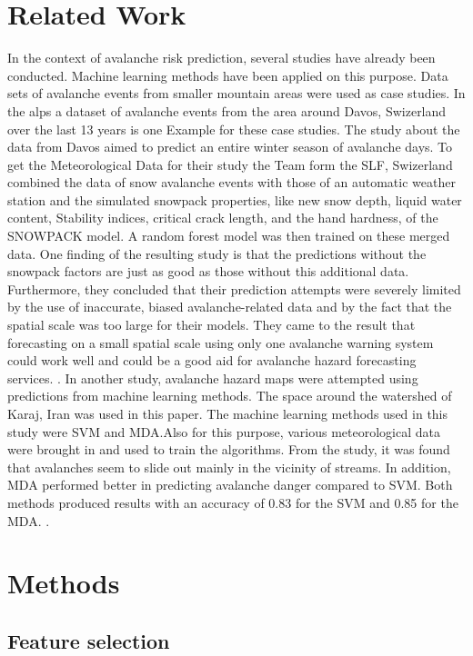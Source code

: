 \documentclass[12pt,a4paper]{article}
\begin{document}
\section{Related Work}
In the context of avalanche risk prediction, several studies have already been conducted. Machine learning methods have been applied on this purpose. Data sets of avalanche events from smaller mountain areas were used as case studies. In the alps a dataset of avalanche events from the area around Davos, Swizerland over the last 13 years is one Example for these case studies. The study about the data from Davos aimed to predict an entire winter season of avalanche days.
To get the Meteorological Data for their study the Team form the SLF, Swizerland combined the data of snow avalanche events with those of an automatic weather station and the simulated snowpack properties, like new snow depth, liquid water content, Stability indices, critical crack length,  and the hand hardness,  of the SNOWPACK model. A random forest model was then trained on these merged data. One finding of the resulting study is that the predictions without the snowpack factors are just as good as those without this additional data. Furthermore, they concluded that their prediction attempts were severely limited by the use of inaccurate, biased avalanche-related data and by the fact that the spatial scale was too large for their models. They came to the result that forecasting on a small spatial scale using only one avalanche warning system could work well and could be a good aid for avalanche hazard forecasting services. \autocite{Harvey:2016}.
In another study, avalanche hazard maps were attempted using predictions from machine learning methods.  The space around the watershed of Karaj, Iran was used in this paper. The machine learning methods used in this study were SVM and MDA.Also for this purpose, various meteorological data were brought in and used to train the algorithms. From the study, it was found that avalanches seem to slide out mainly in the vicinity of streams. In addition, MDA performed better in predicting avalanche danger compared to SVM. Both methods produced results with an accuracy of 0.83 for the SVM and 0.85 for the MDA. \autocites{Bahram:2019}.

\section{Methods}
\subsection{Feature selection}
\end{document}
